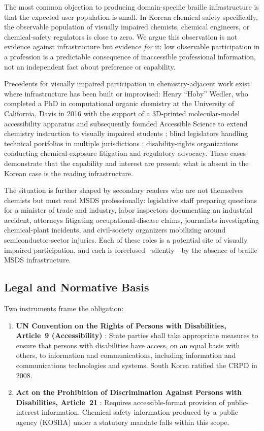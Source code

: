 \documentclass[journal]{IEEEtran}
\begin{document}
The most common objection to producing domain-specific braille infrastructure is that the expected user population is small. In Korean chemical safety specifically, the observable population of visually impaired chemists, chemical engineers, or chemical-safety regulators is close to zero. We argue this observation is not evidence against infrastructure but evidence \emph{for} it: low observable participation in a profession is a predictable consequence of inaccessible professional information, not an independent fact about preference or capability.

Precedents for visually impaired participation in chemistry-adjacent work exist where infrastructure has been built or improvised: Henry ``Hoby'' Wedler, who completed a PhD in computational organic chemistry at the University of California, Davis in 2016 with the support of a 3D-printed molecular-model accessibility apparatus and subsequently founded Accessible Science to extend chemistry instruction to visually impaired students \cite{wedler}; blind legislators handling technical portfolios in multiple jurisdictions \cite{nfb_legislators}; disability-rights organizations conducting chemical-exposure litigation and regulatory advocacy. These cases demonstrate that the capability and interest are present; what is absent in the Korean case is the reading infrastructure.

The situation is further shaped by secondary readers who are not themselves chemists but must read MSDS professionally: legislative staff preparing questions for a minister of trade and industry, labor inspectors documenting an industrial accident, attorneys litigating occupational-disease claims, journalists investigating chemical-plant incidents, and civil-society organizers mobilizing around semiconductor-sector injuries. Each of these roles is a potential site of visually impaired participation, and each is foreclosed---silently---by the absence of braille MSDS infrastructure.

\subsection{Legal and Normative Basis}

Two instruments frame the obligation:

\begin{enumerate}
\item \textbf{UN Convention on the Rights of Persons with Disabilities, Article~9 (Accessibility)} \cite{crpd}: State parties shall take appropriate measures to ensure that persons with disabilities have access, on an equal basis with others, to information and communications, including information and communications technologies and systems. South Korea ratified the CRPD in 2008.

\item \textbf{Act on the Prohibition of Discrimination Against Persons with Disabilities, Article~21} \cite{kdpa}: Requires accessible-format provision of public-interest information. Chemical safety information produced by a public agency (KOSHA) under a statutory mandate falls within this scope.
\end{enumerate}
\end{document}
